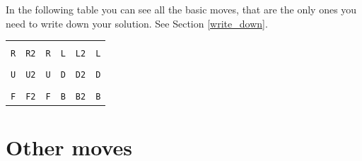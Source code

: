\documentclass[11pt,a4paper]{book}
\newcommand{\p}{\textquotesingle}
\newcommand{\m}{\texttt}
\begin{document}
In the following table you can see all the basic moves, that are the only ones you need to write down your solution. See Section \ref{write_down}.

\begin{center}
\begin{tabular}{|c|c|c|c|c|c|}
\hline
 &  &  &  &  &  \\
\m R & \m{R2} & \m{R\p} & \m L & \m{L2} & \m{L\p}\\
\hline
 &  &  &  &  &  \\
\m U & \m{U2} & \m{U\p} & \m D & \m{D2} & \m{D\p}\\
\hline
 &  &  &  &  &  \\
\m F & \m{F2} & \m{F\p} & \m B & \m{B2} & \m{B\p}\\
\hline
\end{tabular}
\end{center}

\newpage

\section*{Other moves}
\end{document}
